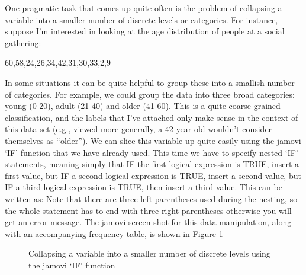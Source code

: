 One pragmatic task that comes up quite often is the problem of collapsing a variable into a smaller number of discrete levels or categories. For instance, suppose I'm interested in looking at the age distribution of people at a social gathering:
\begin{rblock1}
60,58,24,26,34,42,31,30,33,2,9
\end{rblock1}
In some situations it can be quite helpful to group these into a smallish number of categories. For example, we could group the data into three broad categories: young (0-20), adult (21-40) and older (41-60). This is a quite coarse-grained classification, and the labels that I've attached only make sense in the context of this data set (e.g., viewed more generally, a 42 year old wouldn't consider themselves as ``older''). We can slice this variable up quite easily using the jamovi `IF' function that we have already used. This time we have to specify nested `IF' statements, meaning simply that IF the first logical expression is TRUE, insert a first value, but IF a second logical expression is TRUE, insert a second value, but IF a third logical expression is TRUE, then insert a third value. This can be written as: 
\noindent
{} 
Note that there are three left parentheses used during the nesting, so the whole statement has to end with three right parentheses otherwise you will get an error message. The jamovi screen shot for this data manipulation, along with an accompanying frequency table, is shown in Figure \ref{fig:agecats} 

\begin{figure}[p]
\begin{center}
\caption{Collapsing a variable into a smaller number of discrete levels using the jamovi `IF' function}
\label{fig:agecats}
\HR
\end{center}
\end{figure}

